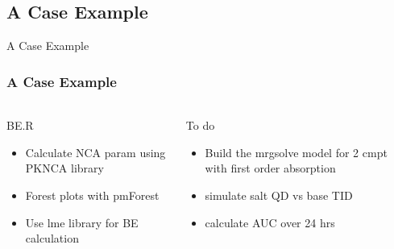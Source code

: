 \documentclass[
	11pt, %
]{beamer}
\begin{document}
 \subsection{A Case Example}
 \begin{frame}[fragile]{A Case Example}
  	\frametitle{A Case Example}
 	\framesubtitle{} %
	\begin{columns}[c]
		\begin{column}{0.5\textwidth}
		\begin{block}{BE.R}
		\small
	\begin{itemize}
		\item  Calculate NCA param using PKNCA library
		\item  Forest plots with pmForest
		\item  Use lme library for BE calculation
		\end{itemize}
		\end{block}
	\end{column}
		\begin{column}{0.5\textwidth} %
	  	\begin{block}{To do}
	  	\small
		    \begin{itemize}
		     \item Build the mrgsolve model for 2 cmpt with first order absorption
	       \item simulate salt QD vs base TID
		     \item calculate AUC over 24 hrs
		   \end{itemize}
		\end{block}
 	 \end{column}
	\end{columns}
	\end{frame}

\end{document}
